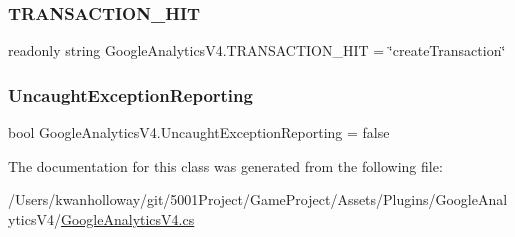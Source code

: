 \subsubsection{\texorpdfstring{T\+R\+A\+N\+S\+A\+C\+T\+I\+O\+N\+\_\+\+H\+IT}{TRANSACTION\_HIT}}
{\footnotesize\ttfamily readonly string Google\+Analytics\+V4.\+T\+R\+A\+N\+S\+A\+C\+T\+I\+O\+N\+\_\+\+H\+IT = \char`\"{}create\+Transaction\char`\"{}\hspace{0.3cm}{\ttfamily [static]}}

\mbox{\label{class_google_analytics_v4_a4ba1da2a054e29b6eccd1e9b67af2c35}} 
\subsubsection{\texorpdfstring{Uncaught\+Exception\+Reporting}{UncaughtExceptionReporting}}
{\footnotesize\ttfamily bool Google\+Analytics\+V4.\+Uncaught\+Exception\+Reporting = false}



The documentation for this class was generated from the following file\+:\begin{DoxyCompactItemize}
\item 
/\+Users/kwanholloway/git/5001\+Project/\+Game\+Project/\+Assets/\+Plugins/\+Google\+Analytics\+V4/\hyperlink{_google_analytics_v4_8cs}{Google\+Analytics\+V4.\+cs}\end{DoxyCompactItemize}
